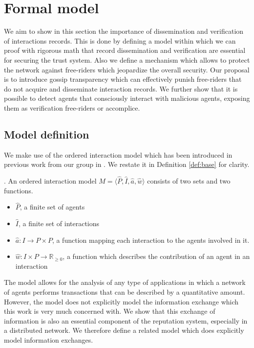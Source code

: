 \chapter{Formal model}
We aim to show in this section the importance of dissemination and verification of interactions 
records. This is done by defining a model within which we can proof with rigorous math that record
dissemination and verification are essential for securing the trust system. Also we define a
mechanism which allows to protect the network against free-riders which 
jeopardize the overall security. Our proposal is to introduce gossip transparency which can 
effectively punish free-riders that do not acquire and disseminate interaction records. We further 
show that it is possible to detect agents that consciously interact with malicious agents, exposing
them as verification free-riders or accomplice.

\section{Model definition}
We make use of the ordered interaction model which has been introduced in previous work from 
our group in \cite{OTTE2017}. We restate it in Definition \ref{def:base} for clarity.

\begin{defn}. 
    \label{def:base}
    An ordered interaction model $\hat M = \langle \hat P, \hat I, \hat a, \hat w \rangle$ consists of two sets and two 
    functions.
    \begin{itemize}
        \item $\hat P$, a finite set of agents
        \item $\hat I$, a finite set of interactions
        \item $\hat a : I \rightarrow P \times P$, a function mapping each interaction to the agents 
        involved in it.
        \item $\hat w : I \times P \rightarrow \mathbb{R}_{\geq0}$, a function which describes the 
        contribution of an agent in an interaction
    \end{itemize}
\end{defn}

The model allows for the analysis of any type of applications in which a network of agents performs
transactions that can be described by a quantitative amount. However, the model does not explicitly
model the information exchange which this work is very much concerned with. We show that this 
exchange of information is also an essential component of the reputation system, especially in a 
distributed network. We therefore define a related model which does explicitly model information 
exchanges.

